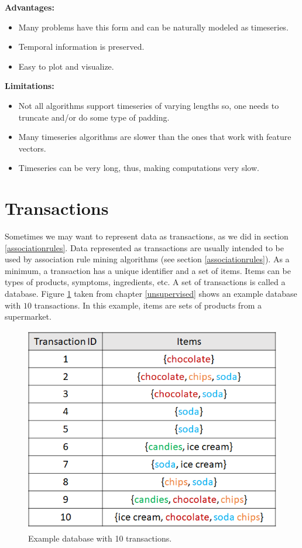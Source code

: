 \documentclass[
  11pt,
]{krantz}
\providecommand{\tightlist}{%
  \setlength{\itemsep}{0pt}\setlength{\parskip}{0pt}}
\begin{document}
\textbf{Advantages:}

\begin{itemize}
\tightlist
\item
  Many problems have this form and can be naturally modeled as timeseries.
\item
  Temporal information is preserved.
\item
  Easy to plot and visualize.
\end{itemize}

\textbf{Limitations:}

\begin{itemize}
\tightlist
\item
  Not all algorithms support timeseries of varying lengths so, one needs to truncate and/or do some type of padding.
\item
  Many timeseries algorithms are slower than the ones that work with feature vectors.
\item
  Timeseries can be very long, thus, making computations very slow.
\end{itemize}

\hypertarget{transactions}{%
\section{Transactions}\label{transactions}}

Sometimes we may want to represent data as transactions, as we did in section \ref{associationrules}. Data represented as transactions are usually intended to be used by association rule mining algorithms (see section \ref{associationrules}). As a minimum, a transaction has a unique identifier and a set of items. Items can be types of products, symptoms, ingredients, etc. A set of transactions is called a database. Figure \ref{fig:transactionsTab2} taken from chapter \ref{unsupervised} shows an example database with \(10\) transactions. In this example, items are sets of products from a supermarket.

\begin{figure}

{\centering \includegraphics[width=0.5\linewidth]{images/transactions_tab} 

}

\caption{Example database with 10 transactions.}\label{fig:transactionsTab2}
\end{figure}
\end{document}

